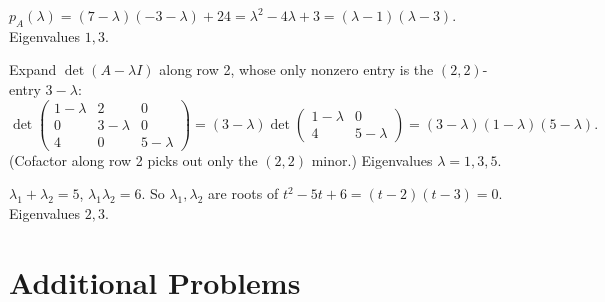\begin{solutions}
  \item $p_{A}(\lambda) = (7 - \lambda)(-3 - \lambda) + 24 = \lambda^{2} - 4 \lambda + 3 = (\lambda - 1)(\lambda - 3)$. Eigenvalues $1, 3$.
  \item Expand $\det(A - \lambda I)$ along row 2, whose only nonzero entry is the $(2, 2)$-entry $3 - \lambda$:
  \[
  \det\!\begin{pmatrix} 1 - \lambda & 2 & 0 \\ 0 & 3 - \lambda & 0 \\ 4 & 0 & 5 - \lambda \end{pmatrix} = (3 - \lambda) \det \begin{pmatrix} 1 - \lambda & 0 \\ 4 & 5 - \lambda \end{pmatrix} = (3 - \lambda)(1 - \lambda)(5 - \lambda).
  \]
  (Cofactor along row 2 picks out only the $(2, 2)$ minor.) Eigenvalues $\lambda = 1, 3, 5$.
  \item $\lambda_{1} + \lambda_{2} = 5$, $\lambda_{1} \lambda_{2} = 6$. So $\lambda_{1}, \lambda_{2}$ are roots of $t^{2} - 5 t + 6 = (t - 2)(t - 3) = 0$. Eigenvalues $2, 3$.
\end{solutions}

\section{Additional Problems}


